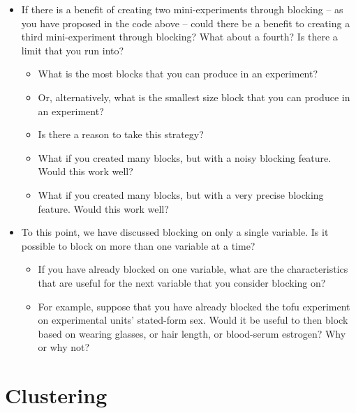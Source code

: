 \documentclass[
]{book}
\providecommand{\tightlist}{%
  \setlength{\itemsep}{0pt}\setlength{\parskip}{0pt}}
\begin{document}
\begin{itemize}
\item
  If there is a benefit of creating two mini-experiments through
  blocking -- as you have proposed in the code above -- could there be a
  benefit to creating a third mini-experiment through blocking? What
  about a fourth? Is there a limit that you run into?

  \begin{itemize}
  \tightlist
  \item
    What is the most blocks that you can produce in an experiment?
  \item
    Or, alternatively, what is the smallest size block that you can
    produce in an experiment?
  \item
    Is there a reason to take this strategy?
  \item
    What if you created many blocks, but with a noisy blocking feature.
    Would this work well?
  \item
    What if you created many blocks, but with a very precise blocking
    feature. Would this work well?
  \end{itemize}
\item
  To this point, we have discussed blocking on only a single variable.
  Is it possible to block on more than one variable at a time?

  \begin{itemize}
  \tightlist
  \item
    If you have already blocked on one variable, what are the
    characteristics that are useful for the next variable that you
    consider blocking on?
  \item
    For example, suppose that you have already blocked the tofu
    experiment on experimental units' stated-form sex. Would it be
    useful to then block based on wearing glasses, or hair length, or
    blood-serum estrogen? Why or why not?
  \end{itemize}
\end{itemize}

\hypertarget{clustering}{%
\section{Clustering}\label{clustering}}
\end{document}

